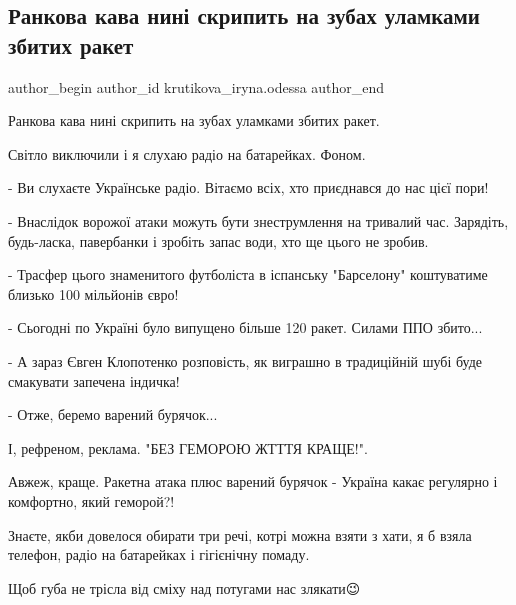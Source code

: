  
 
 
 
 

\subsection{Ранкова кава нині скрипить на зубах уламками збитих ракет}
\label{sec:29_12_2022.fb.krutikova_iryna.odessa.1.rankova_kava_nin__sk}

\ifcmt
 author_begin
   author_id krutikova_iryna.odessa
 author_end
\fi

Ранкова кава нині скрипить на зубах уламками збитих ракет.

Світло виключили і я слухаю радіо на батарейках. Фоном.

- Ви слухаєте Українське радіо. Вітаємо всіх, хто приєднався до нас цієї пори!

- Внаслідок ворожої атаки можуть бути знеструмлення на тривалий час. Зарядіть,
будь-ласка, павербанки і зробіть запас води, хто ще цього не зробив.

- Трасфер цього знаменитого футболіста в іспанську "Барселону" коштуватиме
близько 100 мільйонів євро! 

- Сьогодні по Україні було випущено більше 120 ракет. Силами ППО збито...

- А зараз Євген Клопотенко розповість, як виграшно в традиційній шубі буде
смакувати запечена індичка!

- Отже, беремо варений бурячок...

І, рефреном, реклама. "БЕЗ ГЕМОРОЮ ЖТТТЯ КРАЩЕ!".

Авжеж, краще. Ракетна атака плюс варений бурячок - Україна какає регулярно і
комфортно, який геморой?!

Знаєте, якби довелося обирати три речі, котрі можна взяти з хати, я б взяла
телефон, радіо на батарейках і гігієнічну помаду.

Щоб губа не трісла від сміху над потугами нас злякати😉
